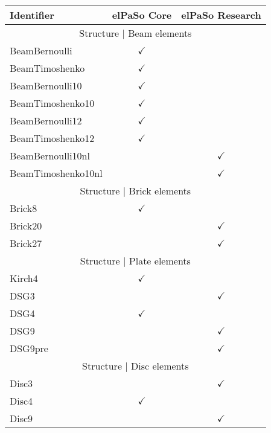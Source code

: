     \begin{longtable}{lcc}
        \hline
        Identifier          & elPaSo Core   & elPaSo Research  \\ \hline
        \multicolumn{3}{c}{Structure   | Beam elements}        \\ \hline
        BeamBernoulli       & $\checkmark$  &                  \\
        BeamTimoshenko      & $\checkmark$  &                  \\
        BeamBernoulli10     & $\checkmark$  &                  \\
        BeamTimoshenko10    & $\checkmark$  &                  \\
        BeamBernoulli12     & $\checkmark$  &                  \\
        BeamTimoshenko12    & $\checkmark$  &                  \\
        BeamBernoulli10nl   &               & $\checkmark$     \\
        BeamTimoshenko10nl  &               & $\checkmark$     \\ \hline
        \multicolumn{3}{c}{Structure | Brick elements}         \\ \hline
        Brick8              & $\checkmark$  &                  \\
        Brick20             &               & $\checkmark$     \\
        Brick27             &               & $\checkmark$     \\ \hline
        \multicolumn{3}{c}{Structure | Plate elements}         \\ \hline
        Kirch4              & $\checkmark$  &                  \\
        DSG3                &               & $\checkmark$     \\
        DSG4                & $\checkmark$  &                  \\
        DSG9                &               & $\checkmark$     \\
        DSG9pre             &               & $\checkmark$     \\ \hline
        \multicolumn{3}{c}{Structure | Disc   elements}        \\ \hline
        Disc3               &               & $\checkmark$     \\
        Disc4               & $\checkmark$  &                  \\
        Disc9               &               & $\checkmark$     \\

\end{longtable}
